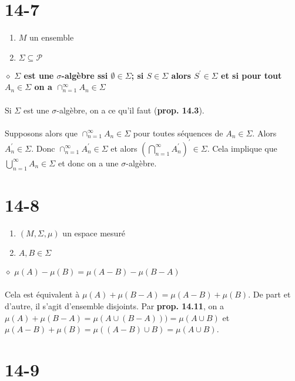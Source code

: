 \documentclass[a4paper,10pt]{article}
\begin{document}
\section*{14-7}
\begin{enumerate}
	\item $M$ un ensemble
	\item $\Sigma \subseteq \mathcal{P}$
\end{enumerate}
$\diamond$ \textbf{$\Sigma$ est une $\sigma$-algèbre ssi $\emptyset \in \Sigma$; si $S \in \Sigma$ alors $S^\prime \in \Sigma$ et si pour tout $A_n \in \Sigma$ on a $\cap_{n=1}^\infty A_n \in \Sigma$}
\\
\\
Si $\Sigma$ est une $\sigma$-algèbre, on a ce qu'il faut (\textbf{prop. 14.3}). 
\\
\\
Supposons alors que $\cap_{n=1}^\infty A_n \in \Sigma$ pour toutes séquences de $A_n \in \Sigma$. Alors $A_n^\prime \in \Sigma$. Donc $\cap_{n=1}^\infty A_n^\prime \in \Sigma$ et alors $\left(\bigcap_{n=1}^\infty A_n^\prime \right)^\prime \in \Sigma$. Cela implique que $\bigcup_{n=1}^\infty A_n \in \Sigma$ et donc on a une $\sigma$-algèbre.

\section*{14-8}
\begin{enumerate}
	\item $(M, \Sigma, \mu)$ un espace mesuré
	\item $A,B \in \Sigma$
\end{enumerate}
$\diamond$ \textbf{$\mu(A) - \mu(B) = \mu(A - B) - \mu(B - A)$}
\\
\\
Cela est équivalent à $\mu(A) + \mu(B - A) = \mu(A-B) + \mu(B)$. De part et d'autre, il s'agit d'ensemble disjoints. Par \textbf{prop. 14.11}, on a $\mu(A) + \mu(B - A) = \mu(A \cup (B - A))) = \mu(A \cup B)$ et $\mu(A-B) + \mu(B) = \mu ( (A-B) \cup B) = \mu(A \cup B)$.

\section*{14-9}
\end{document}

